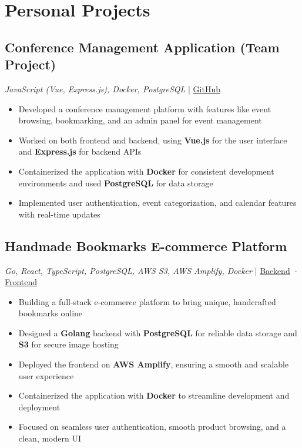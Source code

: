 \documentclass[a4paper,10pt]{article}
\begin{document}
\section{Personal Projects}

\subsection{Conference Management Application (Team Project)}
\textit{JavaScript (Vue, Express.js), Docker, PostgreSQL} | \href{https://github.com/your-github-link}{GitHub}
\begin{itemize}[leftmargin=0.5cm, nosep]
    \item Developed a conference management platform with features like event browsing, bookmarking, and an admin panel for event management
    \item Worked on both frontend and backend, using \textbf{Vue.js} for the user interface and \textbf{Express.js} for backend APIs
    \item Containerized the application with \textbf{Docker} for consistent development environments and used \textbf{PostgreSQL} for data storage
    \item Implemented user authentication, event categorization, and calendar features with real-time updates
\end{itemize}

\subsection{Handmade Bookmarks E-commerce Platform}
\textit{Go, React, TypeScript, PostgreSQL, AWS S3, AWS Amplify, Docker} | \href{https://github.com/ZDSDD/zakladki}{Backend} · \href{https://github.com/ZDSDD/zakladki-front}{Frontend}
\begin{itemize}[leftmargin=0.5cm, nosep]
    \item Building a full-stack e-commerce platform to bring unique, handcrafted bookmarks online
    \item Designed a \textbf{Golang} backend with \textbf{PostgreSQL} for reliable data storage and \textbf{S3} for secure image hosting
    \item Deployed the frontend on \textbf{AWS Amplify}, ensuring a smooth and scalable user experience
    \item Containerized the application with \textbf{Docker} to streamline development and deployment
    \item Focused on seamless user authentication, smooth product browsing, and a clean, modern UI
\end{itemize}
\end{document}
